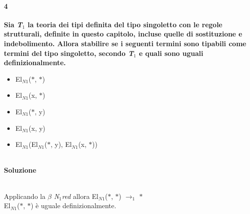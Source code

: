 \documentclass[10pt,a4paper, italian]{book}
\begin{document}
{{{\begin{prooftree}
\end{prooftree}

\paragraph{4} \textbf{Sia \textit{T$_1$} la teoria dei tipi definita del tipo singoletto con le regole strutturali, definite in questo capitolo, incluse quelle di sostituzione e indebolimento. Allora stabilire se i seguenti termini sono tipabili come termini del tipo singoletto, secondo \textit{T$_1$} e quali sono uguali definizionalmente.}
\begin{itemize}
\item El$_{N1}$($\ast$, $\ast$)
\item El$_{N1}$(x, $\ast$)
\item El$_{N1}$($\ast$, y)
\item El$_{N1}$(x, y)
\item El$_{N1}$(El$_{N1}$($\ast$, y), El$_{N1}$(x, $\ast$))
\end{itemize}
\noindent
\\
\textbf{Soluzione}\\\\
\scriptsize
\begin{prooftree}
\end{prooftree}
\normalsize
Applicando la \textit{$\beta$ N$_1$red} allora El$_{N1}$($\ast$, $\ast$) $\rightarrow_1$ $\ast$ \\
El$_{N1}$($\ast$, $\ast$) \`e uguale definizionalmente.

}}}
\end{document}
